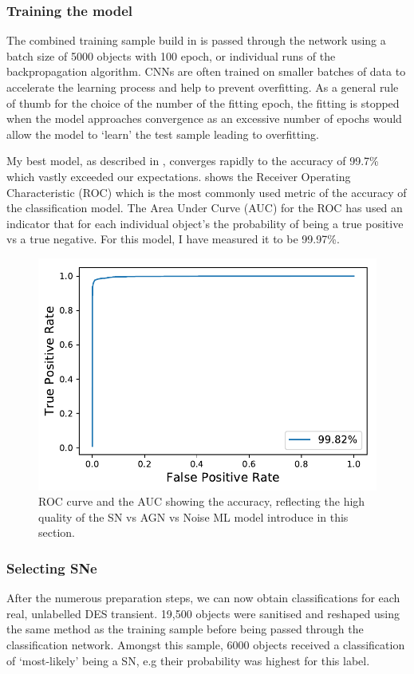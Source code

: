 \subsubsection{Training the model}
The combined training sample build in  is passed through the network using a batch size of 5000 objects with 100 epoch, or individual runs of the backpropagation algorithm. CNNs are often trained on smaller batches of data to accelerate the learning process and help to prevent overfitting. As a general rule of thumb for the choice of the number of the fitting epoch, the fitting is stopped when the model approaches convergence as an excessive number of epochs would allow the model to `learn' the test sample leading to overfitting.

My best model, as described in , converges rapidly to the accuracy of 99.7\% which vastly exceeded our expectations.  shows the Receiver Operating Characteristic (ROC) which is the most commonly used metric of the accuracy of the classification model. The Area Under Curve (AUC) for the ROC has used an indicator that for each individual object's the probability of being a true positive vs a true negative. For this model, I have measured it to be 99.97\%.

\begin{figure}
  \includegraphics[width=\textwidth]{Figures/Chapter5/SNAGNNoiseROC.pdf}
  \caption{ROC curve and the AUC showing the accuracy, reflecting the high quality of the SN vs AGN vs Noise ML model introduce in this section.}
  \label{fig:AGNNoiseROC}
\end{figure}

\subsubsection{Selecting SNe}
After the numerous preparation steps, we can now obtain classifications for each real, unlabelled DES transient. 19,500 objects were sanitised and reshaped using the same method as the training sample before being passed through the classification network. Amongst this sample, 6000 objects received a classification of `most-likely' being a SN, e.g their probability was highest for this label.

